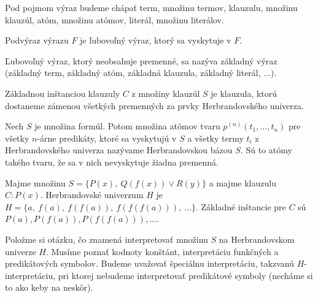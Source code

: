 \begin{definicia}[výraz]
    Pod pojmom výraz budeme chápať 
    term, množinu termov,
    klauzulu, množinu klauzúl,
    atóm, množinu atómov,
    literál, množinu literálov.
\end{definicia}

\begin{definicia}[podvýraz]
    Podvýraz výrazu $F$ je ľubovoľný výraz, ktorý sa vyskytuje v $F$.
\end{definicia}

\begin{definicia}
    Ľubovoľný výraz, ktorý neobsahuje premenné, sa nazýva základný výraz
    (základný term, základný atóm, základná klauzula, základný literál, ...).
\end{definicia}

\begin{definicia}
    Základnou inštanciou klauzuly $C$ z množiny klauzúl $S$ je klauzula,
    ktorú dostaneme zámenou všetkých premenných
    za prvky Herbrandovského univerza.
\end{definicia}

\begin{definicia}
    Nech $S$ je množina formúl. Potom množina atómov
    tvaru $p^{(n)}(t_1, \ldots, t_n)$ pre všetky $n$-árne predikáty,
    ktoré sa vyskytujú v $S$ a všetky termy $t_i$ z Herbrandovského univerza
    nazývame Herbrandovskou bázou $S$.
    Sú to atómy takého tvaru, že sa v nich nevyskytuje žiadna
    premenná.
\end{definicia}

\begin{priklad}
    Majme množinu $S = \{P(x),\ Q(f(x)) \lor R(y) \}$ a majme klauzulu
    $C: P(x)$. 
    Herbrandovské univerzum $H$ je
    $H = \{ a,\ f(a),\ f(f(a)),\ f(f(f(a))),\ \dots \}$.
    Základné inštancie pre $C$ sú $P(a), P(f(a)), P(f(f(a))), \dots$.
\end{priklad}

Položme si otázku, čo znamená interpretovať množinu $S$ na
Herbrandovskom univerze $H$. Musíme poznať kodnoty konštánt,
interpretáciu funkčných a predikátových symbolov. Budeme uvažovať
špeciálnu interpretáciu, takzvanú $H$-interpretáciu, pri ktorej
nebudeme interpretovať predikátové symboly (necháme si to ako keby na
neskôr).

